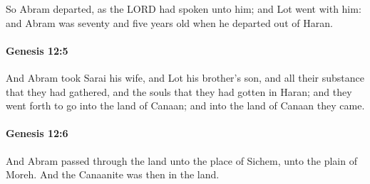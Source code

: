 			So Abram departed, as the LORD had spoken unto him; and Lot went with him: and Abram was seventy and five years old when he departed out of Haran.


		\paragraph{Genesis 12:5} %
			\label{GENESIS-12-5}

			And Abram took Sarai his wife, and Lot his brother's son, and all their substance that they had gathered, and the souls that they had gotten in Haran; and they went forth to go into the land of Canaan; and into the land of Canaan they came.


		\paragraph{Genesis 12:6} %
			\label{GENESIS-12-6}

			And Abram passed through the land unto the place of Sichem, unto the plain of Moreh.  And the Canaanite was then in the land.


